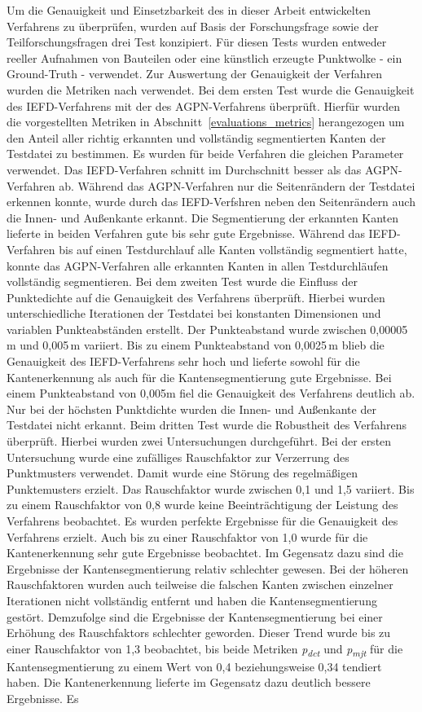 Um die Genauigkeit und Einsetzbarkeit des in dieser Arbeit entwickelten Verfahrens zu überprüfen, wurden auf Basis der Forschungsfrage sowie der Teilforschungsfragen drei Test konzipiert. Für diesen Tests wurden entweder reeller Aufnahmen von Bauteilen oder eine künstlich erzeugte Punktwolke - ein Ground-Truth - verwendet. Zur Auswertung der Genauigkeit der Verfahren wurden die Metriken nach \autocite[13]{ni_edge_2016} verwendet. Bei dem ersten Test wurde die Genauigkeit des IEFD-Verfahrens mit der des AGPN-Verfahrens überprüft. Hierfür wurden die vorgestellten Metriken in Abschnitt~\ref{evaluations_metrics} herangezogen um den Anteil aller richtig erkannten und vollständig segmentierten Kanten der Testdatei zu bestimmen. Es wurden für beide Verfahren die gleichen Parameter verwendet. Das IEFD-Verfahren schnitt im Durchschnitt besser als das AGPN-Verfahren ab. Während das AGPN-Verfahren nur die Seitenrändern der Testdatei erkennen konnte, wurde durch das IEFD-Verfshren neben den Seitenrändern auch die Innen- und Außenkante erkannt. Die Segmentierung der erkannten Kanten lieferte in beiden Verfahren gute bis sehr gute Ergebnisse. Während das IEFD-Verfahren bis auf einen Testdurchlauf alle Kanten vollständig segmentiert hatte, konnte das AGPN-Verfahren alle erkannten Kanten in allen Testdurchläufen vollständig segmentieren. Bei dem zweiten Test wurde die Einfluss der Punktedichte auf die Genauigkeit des Verfahrens überprüft. Hierbei wurden unterschiedliche Iterationen der Testdatei bei konstanten Dimensionen und variablen Punkteabständen erstellt. Der Punkteabstand wurde zwischen 0,00005\,\si{\m} und 0,005\,\si{\m} variiert. Bis zu einem Punkteabstand von 0,0025\,\si{\m} blieb die Genauigkeit des IEFD-Verfahrens sehr hoch und lieferte sowohl für die Kantenerkennung als auch für die Kantensegmentierung gute Ergebnisse. Bei einem Punkteabstand von 0,005m fiel die Genauigkeit des Verfahrens deutlich ab. Nur bei der höchsten Punktdichte wurden die Innen- und Außenkante der Testdatei nicht erkannt. Beim dritten Test wurde die Robustheit des Verfahrens überprüft. Hierbei wurden zwei Untersuchungen durchgeführt. Bei der ersten Untersuchung wurde eine zufälliges Rauschfaktor zur Verzerrung des Punktmusters verwendet. Damit wurde eine Störung des regelmäßigen Punktemusters erzielt. Das Rauschfaktor wurde zwischen 0,1 und 1,5 variiert. Bis zu einem Rauschfaktor von 0,8 wurde keine Beeinträchtigung der Leistung des Verfahrens beobachtet. Es wurden perfekte Ergebnisse für die Genauigkeit des Verfahrens erzielt. Auch bis zu einer Rauschfaktor von 1,0 wurde für die Kantenerkennung sehr gute Ergebnisse beobachtet. Im Gegensatz dazu sind die Ergebnisse der Kantensegmentierung relativ schlechter gewesen. Bei der höheren Rauschfaktoren wurden auch teilweise die falschen Kanten zwischen einzelner Iterationen nicht vollständig entfernt und haben die Kantensegmentierung gestört. Demzufolge sind die Ergebnisse der Kantensegmentierung bei einer Erhöhung des Rauschfaktors schlechter geworden. Dieser Trend wurde bis zu einer Rauschfaktor von 1,3 beobachtet, bis beide Metriken \textit{p\textsubscript{dct}} und \textit{p\textsubscript{mjt}} für die Kantensegmentierung zu einem Wert von 0,4 beziehungsweise 0,34 tendiert haben. Die Kantenerkennung lieferte im Gegensatz dazu deutlich bessere Ergebnisse. Es 